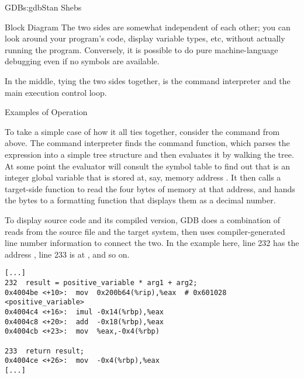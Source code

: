 \begin{aosachapter}{GDB}{s:gdb}{Stan Shebs}
\begin{aosasect1}{Block Diagram}
The two sides are somewhat independent of each other; you can look
around your program's code, display variable types, etc, without
actually running the program.  Conversely, it is possible to do pure
machine-language debugging even if no symbols are available.

In the middle, tying the two sides together, is the command
interpreter and the main execution control loop.

\end{aosasect1}

\begin{aosasect1}{Examples of Operation}

To take a simple case of how it all ties together, consider the 
command from above.  The command interpreter finds the  command
function, which parses the expression into a simple tree structure and
then evaluates it by walking the tree.  At some point the evaluator
will consult the symbol table to find out that
 is an integer global variable that is stored
at, say, memory address .  It then calls a target-side
function to read the four bytes of memory at that address, and hands
the bytes to a formatting function that displays them as a decimal
number.

To display source code and its compiled version, GDB does a
combination of reads from the source file and the target system, then
uses compiler-generated line number information to connect the two.
In the example here, line 232 has the address , line
233 is at , and so on.

\begin{verbatim}
[...]
232  result = positive_variable * arg1 + arg2;
0x4004be <+10>:  mov  0x200b64(%rip),%eax  # 0x601028 <positive_variable>
0x4004c4 <+16>:  imul -0x14(%rbp),%eax
0x4004c8 <+20>:  add  -0x18(%rbp),%eax
0x4004cb <+23>:  mov  %eax,-0x4(%rbp)

233  return result;
0x4004ce <+26>:  mov  -0x4(%rbp),%eax
[...]
\end{verbatim}


\end{aosasect1}
\end{aosachapter}
